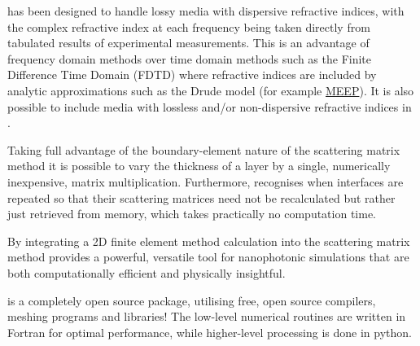 \documentclass[11pt,a4paper,twoside]{report}
\begin{document}
\CodeName has been designed to handle lossy media with dispersive refractive indices, with the complex refractive index at each frequency being taken directly from tabulated results of experimental measurements. This is an advantage of frequency domain methods over time domain methods such as the Finite Difference Time Domain (FDTD) where refractive indices are included by analytic approximations such as the Drude model (for example \href{http://ab-initio.mit.edu/wiki/index.php/Meep}{MEEP}). It is also possible to include media with lossless and/or non-dispersive refractive indices in \CodeName.

Taking full advantage of the boundary-element nature of the scattering matrix method it is possible to vary the thickness of a layer by a single, numerically inexpensive, matrix multiplication. Furthermore, \CodeName recognises when interfaces are repeated so that their scattering matrices need not be recalculated but rather just retrieved from memory, which takes practically no computation time.

By integrating a 2D finite element method calculation into the scattering matrix method \CodeName provides a powerful, versatile tool for nanophotonic simulations that are both computationally efficient and physically insightful. 

\CodeName is a completely open source package, utilising free, open source compilers, meshing programs and libraries! The low-level numerical routines are written in Fortran for optimal performance, while higher-level processing is done in python.
\end{document}
